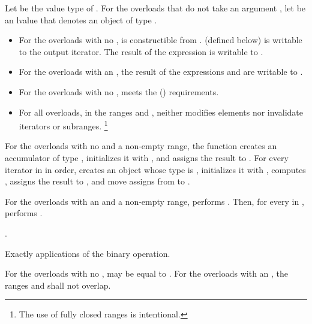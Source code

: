 \begin{itemdescr}
\pnum
Let  be the value type of .
For the overloads that do not take an argument ,
let  be an lvalue
that denotes an object of type .

\pnum
\mandates
\begin{itemize}
\item
  For the overloads with no ,
   is constructible from .
   (defined below) is
  writable
  to the  output iterator.
  The result of the expression 
  is writable to .
\item
  For the overloads with an ,
  the result of the expressions  and
   are writable to .
\end{itemize}

\pnum
\expects
\begin{itemize}
\item
  For the overloads with no ,
   meets the  ()
  requirements.
\item
  For all overloads, in the ranges 
  and ,
   neither modifies elements
  nor invalidate iterators or subranges.%
  \footnote{The use of fully closed ranges is intentional.}
\end{itemize}


\pnum
\effects
For the overloads with no  and a non-empty range,
the function creates an accumulator  of type ,
initializes it with ,
and assigns the result to .
For every iterator  in  in order,
creates an object  whose type is ,
initializes it with ,
computes ,
assigns the result to , and
move assigns from  to .

\pnum
For the overloads with an  and a non-empty range,
performs .
Then, for every  in ,
performs .

\pnum
\returns
{}.

\pnum
\complexity
Exactly  applications of the binary operation.

\pnum
\remarks
For the overloads with no ,
 may be equal to .
For the overloads with an ,
the ranges  and 
shall not overlap.
\end{itemdescr}

